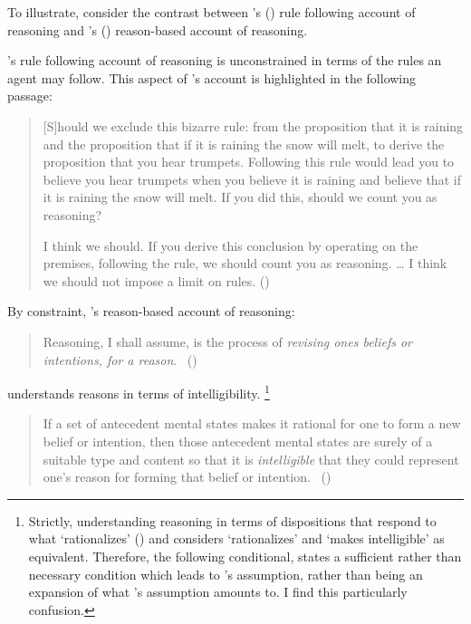 \begin{note}[No constraints]
  To illustrate, consider the contrast between \citeauthor{Broome:2013aa}'s (\citeyear{Broome:2013aa}) rule following account of reasoning and \citeauthor{Wedgwood:2006ui}'s (\citeyear{Wedgwood:2006ui}) reason-based account of reasoning.

  \citeauthor{Broome:2013aa}'s rule following account of reasoning is unconstrained in terms of the rules an agent may follow.
  This aspect  of \citeauthor{Broome:2013aa}'s account is highlighted in the following passage:

  \begin{quote}
    [S]hould we exclude this bizarre rule: from the proposition that it is raining and the proposition that if it is raining the snow will melt, to derive the proposition that you hear trumpets.
    Following this rule would lead you to believe you hear trumpets when you believe it is raining and believe that if it is raining the snow will melt.
    If you did this, should we count you as reasoning?

    I think we should.
    If you derive this conclusion by operating on the premises, following the rule, we should count you as reasoning.
    \dots
    I think we should not impose a limit on rules.%
    \mbox{}\hfill\mbox{(\citeyear[233]{Broome:2013aa})}
  \end{quote}

  By constraint, \citeauthor{Wedgwood:2006ui}'s reason-based account of reasoning:

  \begin{quote}
    Reasoning, I shall assume, is the process of \emph{revising ones beliefs or intentions, for a reason}.%
    \mbox{ }\hfill\mbox{(\citeyear[600]{Wedgwood:2006ui})}
  \end{quote}

  \citeauthor{Wedgwood:2006ui} understands reasons in terms of intelligibility.%
  \footnote{
    Strictly, \citeauthor{Wedgwood:2006ui} understanding reasoning in terms of dispositions that respond to what `rationalizes' (\citeyear[672]{Wedgwood:2006ui}) and \citeauthor{Wedgwood:2006ui} considers `rationalizes' and  `makes intelligible' as equivalent.
    Therefore, the following conditional, states a sufficient rather than necessary condition which leads to \citeauthor{Wedgwood:2006ui}'s assumption, rather than being an expansion of what \citeauthor{Wedgwood:2006ui}'s assumption amounts to.
    I find this particularly confusion.
  }

  \begin{quote}
    If a set of antecedent mental states makes it rational for one to form a new belief or intention, then those antecedent mental states are surely of a suitable type and content so that it is \emph{intelligible} that they could represent one's reason for forming that belief or intention.\newline
    \mbox{ }\hfill\mbox{(\citeyear[662]{Wedgwood:2006ui})}
  \end{quote}


\end{note}
